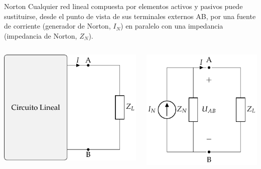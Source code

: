 \documentclass[aspectratio=169, usenames,svgnames,dvipsnames]{beamer}
\begin{document}
\begin{frame}[label={sec:org4b4bfd6}]{Norton}
Cualquier \alert{red lineal} compuesta por elementos activos y pasivos puede sustituirse, desde el punto de vista de sus terminales externos AB, por una \alert{fuente de corriente} (generador de Norton, \(I_N\)) en \alert{paralelo} con una impedancia (impedancia de Norton, \(Z_N\)).

\begin{columns}
\begin{column}{0.5\columnwidth}
\begin{center}
\includegraphics[height=0.6\textheight]{../figs/CircuitoLineal_ZL.pdf}
\end{center}
\end{column}

\begin{column}{0.5\columnwidth}
\begin{center}
\includegraphics[height=0.6\textheight]{../figs/EquivalenteNorton.pdf}
\end{center}
\end{column}
\end{columns}
\end{frame}
\end{document}
